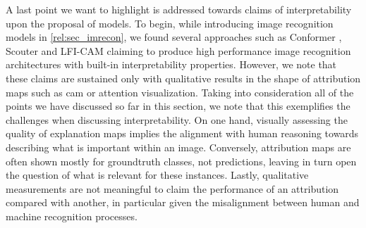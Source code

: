 \noindent A last point we want to highlight is addressed towards claims of interpretability upon 
the proposal of models. To begin, while introducing image recognition models in 
\autoref{rel:sec_imrecon}, we found several approaches such as Conformer 
\autocite{peng2021conformer}, Scouter \autocite{li2021scouter} and LFI-CAM \autocite{lee2021lfi} 
claiming to produce high performance image recognition architectures with built-in interpretability 
properties. However, we note that these claims are sustained only with qualitative results in the 
shape of attribution maps such as \gls{cam} or attention visualization. Taking into consideration 
all of the points we have discussed so far in this section, we note that this exemplifies the 
challenges when discussing interpretability. On one hand, visually assessing the quality of 
explanation maps implies the alignment with human reasoning towards describing what is important 
within an image. Conversely, attribution maps are often shown mostly for groundtruth classes, not 
predictions, leaving in turn open the question of what is relevant for these instances. Lastly, 
qualitative measurements are not meaningful to claim the performance of an attribution compared 
with another, in particular given the misalignment between human and machine recognition processes.

